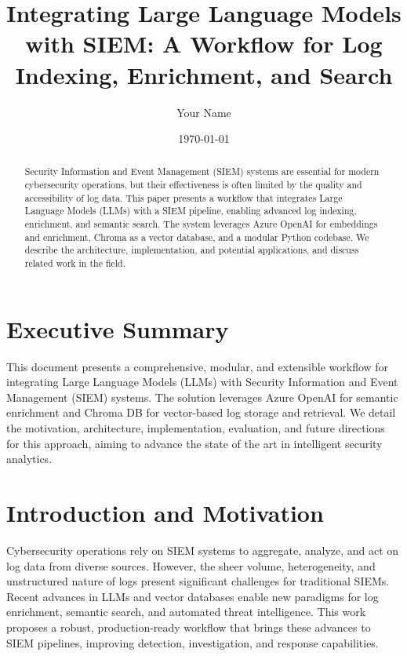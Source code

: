 \documentclass{article}
\title{Integrating Large Language Models with SIEM: A Workflow for Log Indexing, Enrichment, and Search}
\author{Your Name}
\date{\today}
\begin{document}
\maketitle

\begin{abstract}
Security Information and Event Management (SIEM) systems are essential for modern cybersecurity operations, but their effectiveness is often limited by the quality and accessibility of log data. This paper presents a workflow that integrates Large Language Models (LLMs) with a SIEM pipeline, enabling advanced log indexing, enrichment, and semantic search. The system leverages Azure OpenAI for embeddings and enrichment, Chroma as a vector database, and a modular Python codebase. We describe the architecture, implementation, and potential applications, and discuss related work in the field.
\end{abstract}

\section*{Executive Summary}
This document presents a comprehensive, modular, and extensible workflow for integrating Large Language Models (LLMs) with Security Information and Event Management (SIEM) systems. The solution leverages Azure OpenAI for semantic enrichment and Chroma DB for vector-based log storage and retrieval. We detail the motivation, architecture, implementation, evaluation, and future directions for this approach, aiming to advance the state of the art in intelligent security analytics.

\section{Introduction and Motivation}
Cybersecurity operations rely on SIEM systems to aggregate, analyze, and act on log data from diverse sources. However, the sheer volume, heterogeneity, and unstructured nature of logs present significant challenges for traditional SIEMs. Recent advances in LLMs and vector databases enable new paradigms for log enrichment, semantic search, and automated threat intelligence. This work proposes a robust, production-ready workflow that brings these advances to SIEM pipelines, improving detection, investigation, and response capabilities.

\end{document}

